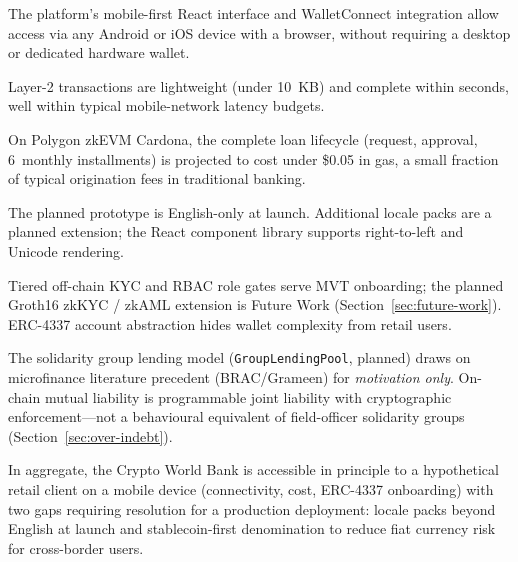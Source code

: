 \documentclass[12pt,a4paper]{report}
\begin{document}
\begin{description}[leftmargin=0pt]

\item[\textbf{1. Device access.}] The platform's mobile-first React interface and WalletConnect integration allow access via any Android or iOS device with a browser, without requiring a desktop or dedicated hardware wallet.

\item[\textbf{2. Connectivity.}] Layer-2 transactions are lightweight (under 10~KB) and complete within seconds, well within typical mobile-network latency budgets.

\item[\textbf{3. Transaction cost.}] On Polygon zkEVM Cardona, the complete loan lifecycle (request, approval, 6~monthly installments) is projected to cost under \$0.05 in gas, a small fraction of typical origination fees in traditional banking.

\item[\textbf{4. Language and literacy.}] The planned prototype is English-only at launch. Additional locale packs are a planned extension; the React component library supports right-to-left and Unicode rendering.

\item[\textbf{5. Identity and onboarding.}] Tiered off-chain KYC and RBAC role gates serve MVT onboarding; the planned Groth16 zkKYC / zkAML extension is Future Work (Section~\ref{sec:future-work}). ERC-4337 account abstraction hides wallet complexity from retail users.

\item[\textbf{6. Group lending fit.}] The solidarity group lending model (\texttt{GroupLendingPool}, planned) draws on microfinance literature precedent (BRAC/Grameen) for \textit{motivation only}. On-chain mutual liability is programmable joint liability with cryptographic enforcement---not a behavioural equivalent of field-officer solidarity groups (Section~\ref{sec:over-indebt}).

\end{description}

In aggregate, the Crypto World Bank is accessible in principle to a hypothetical retail client on a mobile device (connectivity, cost, ERC-4337 onboarding) with two gaps requiring resolution for a production deployment: locale packs beyond English at launch and stablecoin-first denomination to reduce fiat currency risk for cross-border users.


\end{document}
